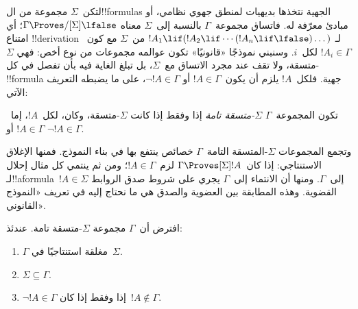 \documentclass[../../../include/open-logic-section]{subfiles}
\begin{document}


لتكن~$\Sigma$ مجموعة من ال!!{formula}s الجهية نتخذها بديهيات
لمنطق جهوي نظامي، أو مبادئ معرّفة له. فاتساق مجموعة~$\Gamma$
بالنسبة إلى~$\Sigma$ معناه $\Gamma \Proves/[\Sigma] \lfalse$؛
أي امتناع !!{derivation} لـ
$!A_1 \lif (!A_2 \lif \cdots (!A_n \lif \lfalse)\dots)$ من~$\Sigma$
مع كون~$!A_i \in \Gamma$ لكل~$i$.
وسنبني نموذجًا «قانونيًا» تكون عوالمه مجموعات من نوع أخص:
فهي $\Sigma$-متسقة، ولا تقف عند مجرد الاتساق مع~$\Sigma$،
بل تبلغ الغاية فيه بأن تفصل في كل !!{formula} جهية.
فلكل~$!A$ يلزم أن يكون~$!A \in \Gamma$ أو $\lnot !A \in \Gamma$،
على ما يضبطه التعريف الآتي:

\begin{defn}
  تكون المجموعة~$\Gamma$ \emph{$\Sigma$-متسقة تامة} إذا وفقط إذا
  كانت $\Sigma$-متسقة، وكان، لكل~$!A$، إما~$!A \in \Gamma$ أو
  $\lnot !A \in \Gamma$.
\end{defn}

وتجمع المجموعات $\Sigma$-المتسقة التامة~$\Gamma$ خصائص ينتفع بها
في بناء النموذج. فمنها الإغلاق الاستنتاجي:
إذا كان~$\Gamma \Proves[\Sigma] !A$ لزم~$!A \in \Gamma$؛
ومن ثم ينتمي كل مثال إحلال لـ!!a{formula}~$!A \in \Sigma$ إلى~$\Gamma$.
ومنها أن الانتماء إلى~$\Gamma$ يجري على شروط صدق الروابط القضوية.
وهذه المطابقة بين العضوية والصدق هي ما نحتاج إليه في تعريف
«النموذج القانوني».

\begin{prop}
  افترض أن~$\Gamma$ مجموعة $\Sigma$-متسقة تامة. عندئذ:
  \begin{enumerate}
  \item {}%
    $\Gamma$ مغلقة استنتاجيًا في~$\Sigma$.
  \item {}%
    $\Sigma \subseteq \Gamma$.
  \item {}%
    $\lnot!A \in \Gamma$ إذا وفقط إذا كان~$!A \notin \Gamma$.
  \end{enumerate}
\end{prop}
\end{document}
